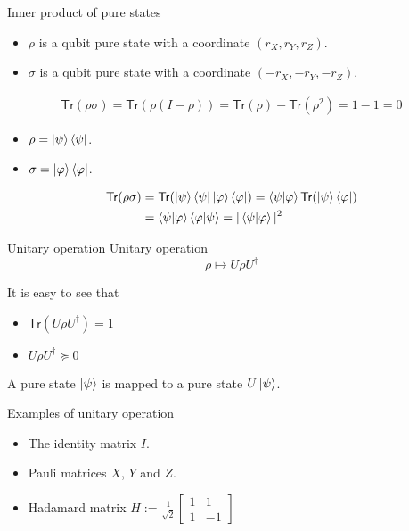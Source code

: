 \documentclass{beamer}
\newcommand{\Tr}{\mathsf{Tr}}
\begin{document}
\begin{frame}{Inner product of pure states}
\begin{itemize}
\item $\rho$ is a qubit pure state with a coordinate $(r_X,r_Y,r_Z)$.
\item $\sigma$ is a qubit pure state with a coordinate $(-r_X,-r_Y,-r_Z)$.
\end{itemize}
\begin{align*}
\Tr(\rho\sigma) =
\Tr(\rho(I-\rho)) =
\Tr(\rho)-\Tr(\rho^2) =1-1=0
\end{align*}

\vspace{2em}
\begin{itemize}
\item $\rho=\ket{\psi}\bra{\psi}$.
\item $\sigma=\ket{\varphi}\bra{\varphi}$.
\end{itemize}
\begin{align*}
\Tr(\rho\sigma) &=
\Tr(\ket{\psi}\bra{\psi}\ket{\varphi}\bra{\varphi}) =
\braket{\psi|\varphi}\Tr(\ket{\psi}\bra{\varphi})\\
 &= \braket{\psi|\varphi}\braket{\varphi|\psi}
 = |\braket{\psi|\varphi}|^2
\end{align*}
\end{frame}

\begin{frame}{Unitary operation}
Unitary operation
\begin{equation*}
\rho\mapsto U\rho U^\dagger
\end{equation*}

\vspace{2em}
It is easy to see that
\begin{itemize}
\item $\Tr(U\rho U^\dagger)=1$
\item $U\rho U^\dagger\succeq 0$
\end{itemize}

\vspace{3em}
A pure state $\ket{\psi}$ is mapped to a pure state $U\ket{\psi}$.
\end{frame}

\begin{frame}{Examples of unitary operation}
\begin{itemize}
\setlength{\itemsep}{2em}
\item The identity matrix $I$.
\item Pauli matrices $X$, $Y$ and $Z$.
\item Hadamard matrix $H:=\frac1{\sqrt{2}}\begin{bmatrix}1&1\\1&-1\end{bmatrix}$
\end{itemize}
\end{frame}
\end{document}
